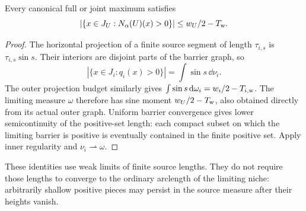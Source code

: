 \begin{corollary}\label{cor:variation-projection}
Every canonical full or joint maximum satisfies
\begin{equation}\label{eq:variation-projection}
 |\{x\in J_U:N_\alpha(U)(x)>0\}|\le w_U/2-T_{\rm w}.
\end{equation}
\end{corollary}

\begin{proof}
The horizontal projection of a finite source segment of length
$\tau_{i,s}$ is $\tau_{i,s}\sin s$. Their interiors are disjoint
parts of the barrier graph, so
\[
 |\{x\in J_i:q_i(x)>0\}|=\int\sin s\,\dd\nu_i.
\]
The outer projection budget similarly gives
$\int\sin s\,\mathrm{d}\omega_i=w_i/2-T_{i,\rm w}$.
The limiting measure $\omega$ therefore has sine moment
$w_U/2-T_{\rm w}$, also obtained directly from its actual outer graph.
Uniform barrier convergence gives lower semicontinuity of the
positive-set length: each compact subset on which the limiting
barrier is positive is eventually contained in the finite positive
set. Apply inner regularity and $\nu_i\rightharpoonup\omega$.
\end{proof}

These identities use weak limits of finite source lengths.
They do not require those lengths to converge to the ordinary
arclength of the limiting niche: arbitrarily shallow positive
pieces may persist in the source measure after their heights vanish.
